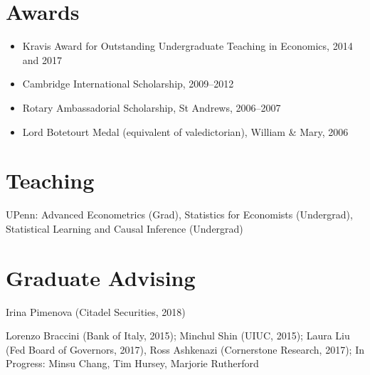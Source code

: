 \documentclass[line,overlapped]{myres}
\begin{document}
\begin{resume}


\section{\sc Awards}
\vspace{1em}
\begin{itemize}
\item Kravis Award for Outstanding Undergraduate Teaching in Economics, 2014 and 2017
\item Cambridge International Scholarship, 2009--2012
\item Rotary Ambassadorial Scholarship, St Andrews, 2006--2007
\item Lord Botetourt Medal (equivalent of valedictorian), William \& Mary, 2006
\end{itemize}

\section{\sc Teaching }
\vspace{0.5em}
	UPenn: Advanced Econometrics (Grad), Statistics for Economists (Undergrad), Statistical Learning and Causal Inference (Undergrad)
	


\section{\sc Graduate Advising}
\begin{description}[style=multiline,leftmargin=3cm,font=\normalfont]
  \item[Main Supervisor:] Irina Pimenova (Citadel Securities, 2018)
  \item[Committee \\ Member:] Lorenzo Braccini (Bank of Italy, 2015); Minchul Shin (UIUC, 2015); Laura Liu (Fed Board of Governors, 2017), Ross Ashkenazi (Cornerstone Research, 2017); 
    In Progress: Minsu Chang, Tim Hursey, Marjorie Rutherford 
\end{description}



\end{resume}
\end{document}
